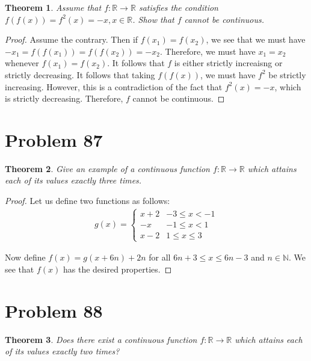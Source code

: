 \documentclass[psamsfonts]{amsart}
\newtheorem{thm}{Theorem}[section]
\theoremstyle{definition}
\theoremstyle{remark}
\numberwithin{equation}{section}
\begin{document}
\begin{thm}
Assume that $f: \mathbb{R} \to \mathbb{R}$ satisfies the condition $f(f(x)) = f^2(x) = -x, x \in \mathbb{R}$. Show that $f$ cannot be continuous.
\end{thm}

\begin{proof}
Assume the contrary. Then if $f(x_1) = f(x_2)$, we see that we must have $-x_1 = f(f(x_1)) = f(f(x_2)) = -x_2$. Therefore, we must have $x_1 = x_2$ whenever $f(x_1) = f(x_2)$. It follows that $f$ is either strictly increaisng or strictly decreasing. It follows that taking $f(f(x))$, we must have $f^2$ be strictly increasing. However, this is a contradiction of the fact that $f^2(x) = -x$, which is strictly decreasing. Therefore, $f$ cannot be continuous. 
\end{proof}

\section{Problem 87}

\begin{thm}
Give an example of a continuous function $f: \mathbb{R} \to \mathbb{R}$ which attains each of its values exactly three times. 
\end{thm}

\begin{proof}
Let us define two functions as follows:
\begin{eqnarray}
g(x) = \left\{ \begin{array}{ll}
x + 2 & -3 \leq x < -1 \\
-x & -1 \leq x < 1 \\
x - 2 & 1 \leq x \leq 3 
\end{array} \right.
\end{eqnarray}

Now define $f(x) = g(x + 6n) + 2n$ for all $6n + 3 \leq x \leq 6n -3$ and $n \in \mathbb{N}$. We see that $f(x)$ has the desired properties. 
\end{proof}

\section{Problem 88}

\begin{thm}
Does there exist a continuous function $f: \mathbb{R} \to \mathbb{R}$ which attains each of its values exactly two times?
\end{thm}
\end{document}
